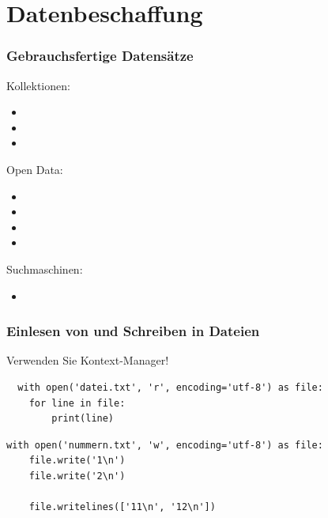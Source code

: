 \section{Datenbeschaffung}


\begin{frame}
	\frametitle{\glqq{}Gebrauchsfertige\grqq{} Datensätze}
	
	Kollektionen: \vspace{-.33\baselineskip}
	\begin{itemize}
		\item {}
		\item {}
		\item {}
	\end{itemize}
	
	Open Data: \vspace{-.33\baselineskip}
	\begin{itemize}
		\item {}
		\item {}
		\item {}
		\item {}
	\end{itemize}
	
	Suchmaschinen: \vspace{-.33\baselineskip}
	\begin{itemize}
		\item {}
	\end{itemize}
\end{frame}

\begin{frame}[fragile]
	\frametitle{Einlesen von und Schreiben in Dateien}
	
	Verwenden Sie Kontext-Manager!
	
\begin{verbatim}
  with open('datei.txt', 'r', encoding='utf-8') as file:
    for line in file:
        print(line)
\end{verbatim}
    
\begin{verbatim}
with open('nummern.txt', 'w', encoding='utf-8') as file:
    file.write('1\n')
    file.write('2\n')

    file.writelines(['11\n', '12\n'])
\end{verbatim}
\end{frame}

